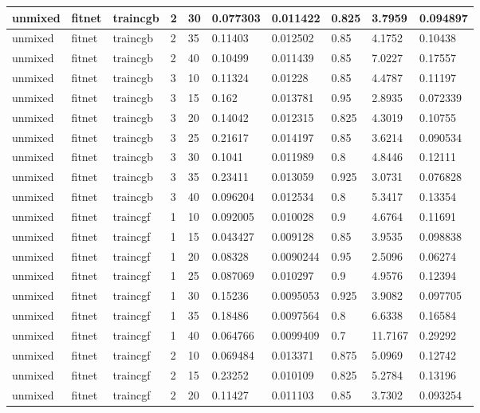 \begin{longtable}{lllllllll}
unmixed & fitnet & traincgb & 2 & 30 & 0.077303 & 0.011422 & 0.825 & 3.7959 & 0.094897 \\ \hline 
unmixed & fitnet & traincgb & 2 & 35 & 0.11403 & 0.012502 & 0.85 & 4.1752 & 0.10438 \\ \hline 
unmixed & fitnet & traincgb & 2 & 40 & 0.10499 & 0.011439 & 0.85 & 7.0227 & 0.17557 \\ \hline 
unmixed & fitnet & traincgb & 3 & 10 & 0.11324 & 0.01228 & 0.85 & 4.4787 & 0.11197 \\ \hline 
unmixed & fitnet & traincgb & 3 & 15 & 0.162 & 0.013781 & 0.95 & 2.8935 & 0.072339 \\ \hline 
unmixed & fitnet & traincgb & 3 & 20 & 0.14042 & 0.012315 & 0.825 & 4.3019 & 0.10755 \\ \hline 
unmixed & fitnet & traincgb & 3 & 25 & 0.21617 & 0.014197 & 0.85 & 3.6214 & 0.090534 \\ \hline 
unmixed & fitnet & traincgb & 3 & 30 & 0.1041 & 0.011989 & 0.8 & 4.8446 & 0.12111 \\ \hline 
unmixed & fitnet & traincgb & 3 & 35 & 0.23411 & 0.013059 & 0.925 & 3.0731 & 0.076828 \\ \hline 
unmixed & fitnet & traincgb & 3 & 40 & 0.096204 & 0.012534 & 0.8 & 5.3417 & 0.13354 \\ \hline 
unmixed & fitnet & traincgf & 1 & 10 & 0.092005 & 0.010028 & 0.9 & 4.6764 & 0.11691 \\ \hline 
unmixed & fitnet & traincgf & 1 & 15 & 0.043427 & 0.009128 & 0.85 & 3.9535 & 0.098838 \\ \hline 
unmixed & fitnet & traincgf & 1 & 20 & 0.08328 & 0.0090244 & 0.95 & 2.5096 & 0.06274 \\ \hline 
unmixed & fitnet & traincgf & 1 & 25 & 0.087069 & 0.010297 & 0.9 & 4.9576 & 0.12394 \\ \hline 
unmixed & fitnet & traincgf & 1 & 30 & 0.15236 & 0.0095053 & 0.925 & 3.9082 & 0.097705 \\ \hline 
unmixed & fitnet & traincgf & 1 & 35 & 0.18486 & 0.0097564 & 0.8 & 6.6338 & 0.16584 \\ \hline 
unmixed & fitnet & traincgf & 1 & 40 & 0.064766 & 0.0099409 & 0.7 & 11.7167 & 0.29292 \\ \hline 
unmixed & fitnet & traincgf & 2 & 10 & 0.069484 & 0.013371 & 0.875 & 5.0969 & 0.12742 \\ \hline 
unmixed & fitnet & traincgf & 2 & 15 & 0.23252 & 0.010109 & 0.825 & 5.2784 & 0.13196 \\ \hline 
unmixed & fitnet & traincgf & 2 & 20 & 0.11427 & 0.011103 & 0.85 & 3.7302 & 0.093254 \\ \hline 

\end{longtable}
